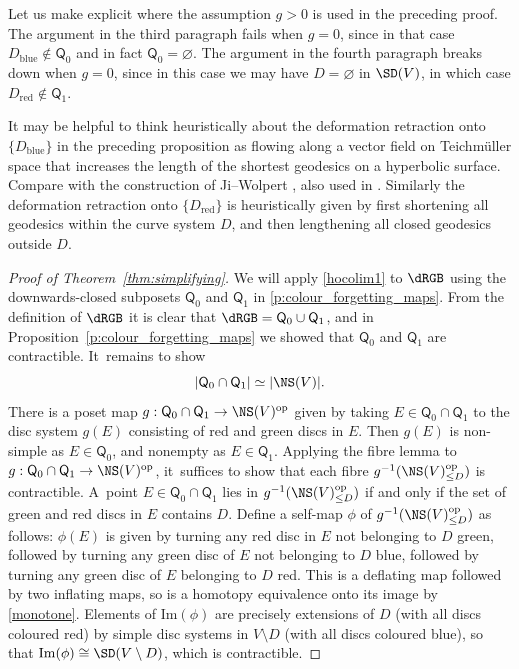 \begin{rem}
Let us make explicit where the assumption $g>0$ is used in the preceding proof. The argument in the third paragraph fails when $g=0$, since in that case $D_{\mathrm{blue}} \notin \mathsf Q_0$ and in fact $\mathsf Q_0 = \varnothing$. The argument in the fourth paragraph breaks down when $g=0$, since in this case we may have $D=\varnothing$ in $\SD(V)$, in which case $D_{\mathrm{red}} \notin \mathsf Q_1$.
\end{rem}

\begin{rem}
It may be helpful to think heuristically about the deformation retraction onto $\{D_{\mathrm{blue}}\}$ in the preceding proposition as flowing along a vector field on Teichmüller space that increases the length of the shortest geodesics on a hyperbolic surface. Compare with the construction of Ji--Wolpert \cite[\S 3]{jiwolpert}, also used in \cite{hainautpetersen}. Similarly the deformation retraction onto $\{D_{\mathrm{red}}\}$ is heuristically given by first shortening all geodesics within the curve system $D$, and then lengthening all closed geodesics outside $D$.
\end{rem}

\begin{proof}[Proof of Theorem~\ref{thm:simplifying}]
We will apply \cref{hocolim1} to $\dRGB$ using the downwards-closed subposets $\mathsf Q_0$ and $\mathsf Q_1$ in \cref{p:colour_forgetting_maps}. From the definition of $\dRGB$ it is clear that $\dRGB =\mathsf Q_0 \cup \mathsf Q_1$, and in Proposition~\ref{p:colour_forgetting_maps} we showed that $\mathsf Q_0$ and $\mathsf Q_1$ are contractible. It~remains to show
\[
|\mathsf Q_0 \cap \mathsf Q_1|\simeq |\NS(V)|.
\]
There is a poset map $g:\mathsf Q_0 \cap \mathsf Q_1\to \NS(V)^{\text{op}}$ given by taking $E \in \mathsf Q_0 \cap \mathsf Q_1$ to the disc system $g(E)$ consisting of red and green discs in $E$. Then $g(E)$ is non-simple as $E \in \mathsf Q_0$, and nonempty as $E \in \mathsf Q_1$. Applying the fibre lemma to $g:\mathsf Q_0 \cap \mathsf Q_1\to \NS(V)^{\text{op}}$, it~suffices to show that each fibre $g^{-1}(\NS(V)^\text{op}_{\leq D})$ is contractible. A~point $E \in \mathsf Q_0 \cap \mathsf Q_1$ lies in $g^{-1}(\NS(V)^\text{op}_{\leq D})$ if and only if the set of green and red discs in $E$ contains $D$. Define a self-map $\phi$ of $g^{-1}(\NS(V)^\text{op}_{\leq D})$ as follows: $\phi(E)$ is given by turning any red disc in $E$ not belonging to $D$ green, followed by turning any green disc of $E$ not belonging to $D$ blue, followed by turning any green disc of $E$ belonging to $D$ red. This is a deflating map followed by two inflating maps, so is a homotopy equivalence onto its image by \cref{monotone}. Elements of $\mathrm{Im}(\phi)$ are precisely extensions of $D$ (with all discs coloured red) by simple disc systems in $V \setminus D$ (with all discs coloured blue), so that $\mathrm{Im}(\phi) \cong \SD(V\setminus D)$, which is contractible.
\end{proof}

